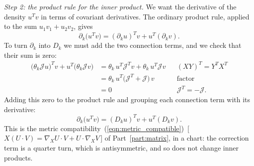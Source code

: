 \emph{Step 2: the product rule for the inner product.} We want the derivative of the density $u^Tv$ in terms of covariant derivatives. The ordinary product rule, applied to the sum $u_1v_1 + u_2v_2$, gives
\begin{equation*}
\partial_k \big(u^Tv\big) = (\partial_ku)^Tv + u^T(\partial_kv) .
\end{equation*}
To turn $\partial_k$ into $D_k$ we must add the two connection terms, and we check that their sum is zero:
\begin{align*}
\big(\theta_k\mathcal J u\big)^Tv + u^T\big(\theta_k\mathcal J v\big) &= \theta_k\, u^T\mathcal J^Tv + \theta_k\, u^T\mathcal J v && (XY)^T = Y^TX^T \\
&= \theta_k\, u^T\big(\mathcal J^T + \mathcal J\big)\,v && \text{factor} \\
&= 0 && \mathcal J^T = -\mathcal J .
\end{align*}
Adding this zero to the product rule and grouping each connection term with its derivative:
\begin{equation}
\label{eqn:r3_compatible}
\partial_k \big(u^Tv\big) = (D_ku)^Tv + u^T(D_kv) .
\end{equation}
This is the metric compatibility~(\ref{eqn:metric_compatible})~[\,$X(U\cdot V) = \nabla_XU\cdot V + U\cdot\nabla_XV$\,] of Part~\ref{part:matrix}, in a chart: the correction term is a quarter turn, which is antisymmetric, and so does not change inner products.

